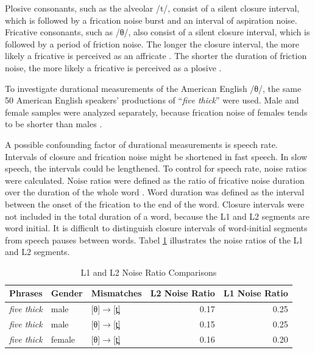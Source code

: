 Plosive consonants, such as the alveolar /t/, consist of a silent closure interval, which is followed by a frication noise burst and an interval of aspiration noise. Fricative consonants, such as /θ/, also consist of a silent closure interval, which is followed by a period of friction noise. The longer the closure interval, the more likely a fricative is perceived as an affricate \citep{Dorman_1980}. The shorter the duration of friction noise, the more likely a fricative is perceived as a plosive \citep{Dorman_1980}. 

To investigate durational measurements of the American English /θ/, the same 50 American English speakers’ productions of “\textit{five thick}” were used. Male and female samples were analyzed separately, because frication noise of females tends to be shorter than males \citep{Jongman_2000}. 

A possible confounding factor of durational measurements is speech rate. Intervals of closure and frication noise might be shortened in fast speech. In slow speech, the intervals could be lengthened. To control for speech rate, noise ratios were calculated. Noise ratios were defined as the ratio of fricative noise duration over the duration of the whole word \citep{Jongman_2000}. Word duration was defined as the interval between the onset of the frication to the end of the word. Closure intervals were not included in the total duration of a word, because the L1 and L2 segments are word initial. It is difficult to distinguish closure intervals of word-initial segments from speech pauses between words. Tabel \ref{table:nr} illustrates the noise ratios of the L1 and L2 segments.

\begin{table}[!h]
  \figSpace
  \centering
  \caption{L1 and L2 Noise Ratio Comparisons}
\label{table:nr}
    \begin{tabular}{lllrr}
    \toprule
    Phrases & Gender & Mismatches & L2 Noise Ratio & L1 Noise Ratio \\
    \midrule
    \textit{five thick} & male  &  [θ]$\rightarrow$[t̪] & 0.17  & 0.25 \\
   \textit{five thick} & male  & [θ]$\rightarrow$[t̪] & 0.15  & 0.25 \\
   \textit{five thick} & female & [θ]$\rightarrow$[t̪] & 0.16  & 0.20 \\
    \bottomrule
    \end{tabular}%
  \figSpace
\end{table}%

